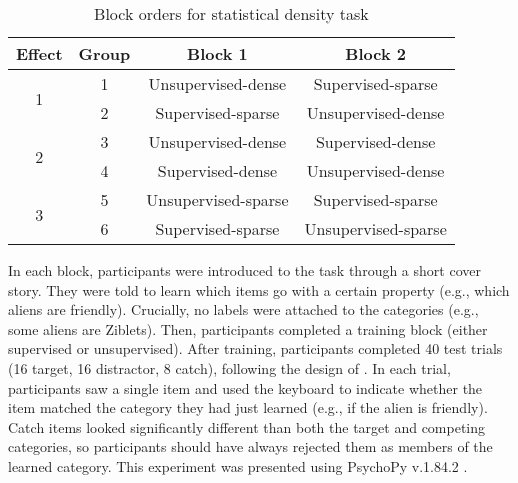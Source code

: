 \documentclass[../dissertation.tex]{subfiles}
\begin{document}
\begin{wraptable}[11]{r}{0.6\linewidth}
\caption{Block orders for statistical density task}
\begin{center}
\begin{tabular}{ c|c|c|c } 
 \hline 
 Effect & Group & Block 1 & Block 2 \\ 
 \hline
 \multirow{2}{*}{1} & 1 & Unsupervised-dense & Supervised-sparse \\ 
 & 2 & Supervised-sparse & Unsupervised-dense \\ 
 \hline
  \multirow{2}{*}{2} & 3 & Unsupervised-dense & Supervised-dense \\ 
 & 4 & Supervised-dense & Unsupervised-dense \\
 \hline 
  \multirow{2}{*}{3} & 5 & Unsupervised-sparse & Supervised-sparse \\ 
 & 6 & Supervised-sparse & Unsupervised-sparse \\ 
 \hline
\end{tabular}
\end{center}
\vspace{-20pt}
\label{exp1order}
\end{wraptable} \par
 In each block, participants were introduced to the task through a short cover story. They were told to learn which items go with a certain property (e.g., which aliens are friendly). Crucially, no labels were attached to the categories (e.g., some aliens are Ziblets). Then, participants completed a training block (either supervised or unsupervised). After training, participants completed 40 test trials (16 target, 16 distractor, 8 catch), following the design of \citet{Kloos2008} . In each trial, participants saw a single item and used the keyboard to indicate whether the item matched the category they had just learned (e.g., if the alien is friendly). Catch items looked significantly different than both the target and competing categories, so participants should have always rejected them as members of the learned category. This experiment was presented using PsychoPy v.1.84.2 \citep{Peirce2007}. \par
\end{document}
